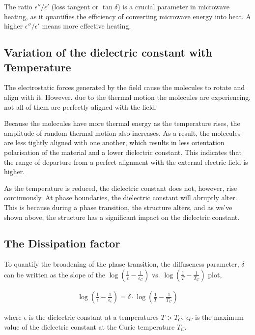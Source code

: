 	The ratio $\epsilon''/\epsilon'$ (loss tangent or $\tan \delta$) is a crucial parameter in microwave heating, as it quantifies the efficiency of converting microwave energy into heat. A higher $\epsilon''/\epsilon'$ means more effective heating. 



	\subsection*{Variation of the dielectric constant with Temperature}
		The electrostatic forces generated by the field cause the molecules to rotate and align with it. However, due to the thermal motion the molecules are experiencing, not all of them are perfectly aligned with the field.

		Because the molecules have more thermal energy as the temperature rises, the amplitude of random thermal motion also increases. As a result, the molecules are less tightly aligned with one another, which results in less orientation polarisation of the material and a lower dielectric constant. This indicates that the range of departure from a perfect alignment with the external electric field is higher.

		As the temperature is reduced, the dielectric constant does not, however, rise continuously. At phase boundaries, the dielectric constant will abruptly alter. This is because during a phase transition, the structure alters, and as we've shown above, the structure has a significant impact on the dielectric constant.
		
	\subsection{The Dissipation factor}

	To quantify the broadening of the phase
	transition, the diffuseness parameter, $\delta$ can be written as the slope of the $\log(\frac{1}{\epsilon}-\frac{1}{\epsilon_C})$ vs. $\log(\frac{1}{T}-\frac{1}{T_C})$ plot,
	
	\begin{align}
		\log\left(\frac{1}{\epsilon}-\frac{1}{\epsilon_c}\right) = \delta \cdot \log\left(\frac{1}{T}-\frac{1}{T_C}\right)
	\end{align}
	
	where $\epsilon$ is the dielectric constant at a temperatures $T > T_C$, ${\epsilon_C}$  is the maximum value of the dielectric constant at the Curie temperature $T_C$. 

